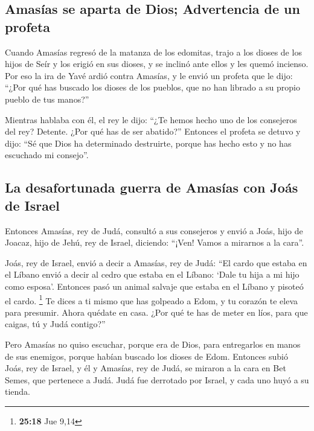 \begin{paracol}{2}
\hypertarget{amasuxedas-se-aparta-de-dios-advertencia-de-un-profeta}{%
\subsection{Amasías se aparta de Dios; Advertencia de un
profeta}\label{amasuxedas-se-aparta-de-dios-advertencia-de-un-profeta}}

 Cuando Amasías regresó de la matanza de los edomitas,
trajo a los dioses de los hijos de Seír y los erigió en sus dioses, y se
inclinó ante ellos y les quemó incienso.  Por eso la ira
de Yavé ardió contra Amasías, y le envió un profeta que le dijo: ``¿Por
qué has buscado los dioses de los pueblos, que no han librado a su
propio pueblo de tus manos?''

 Mientras hablaba con él, el rey le dijo: ``¿Te hemos
hecho uno de los consejeros del rey? Detente. ¿Por qué has de ser
abatido?'' Entonces el profeta se detuvo y dijo: ``Sé que Dios ha
determinado destruirte, porque has hecho esto y no has escuchado mi
consejo''.

\hypertarget{la-desafortunada-guerra-de-amasuxedas-con-jouxe1s-de-israel}{%
\subsection{La desafortunada guerra de Amasías con Joás de
Israel}\label{la-desafortunada-guerra-de-amasuxedas-con-jouxe1s-de-israel}}

 Entonces Amasías, rey de Judá, consultó a sus consejeros
y envió a Joás, hijo de Joacaz, hijo de Jehú, rey de Israel, diciendo:
``¡Ven! Vamos a mirarnos a la cara''.

 Joás, rey de Israel, envió a decir a Amasías, rey de
Judá: ``El cardo que estaba en el Líbano envió a decir al cedro que
estaba en el Líbano: `Dale tu hija a mi hijo como esposa'. Entonces pasó
un animal salvaje que estaba en el Líbano y pisoteó el cardo.
\footnote{\textbf{25:18} Jue 9,14}  Te dices a ti mismo
que has golpeado a Edom, y tu corazón te eleva para presumir. Ahora
quédate en casa. ¿Por qué te has de meter en líos, para que caigas, tú y
Judá contigo?''

 Pero Amasías no quiso escuchar, porque era de Dios, para
entregarlos en manos de sus enemigos, porque habían buscado los dioses
de Edom.  Entonces subió Joás, rey de Israel, y él y
Amasías, rey de Judá, se miraron a la cara en Bet Semes, que pertenece a
Judá.  Judá fue derrotado por Israel, y cada uno huyó a
su tienda.


\end{paracol}
